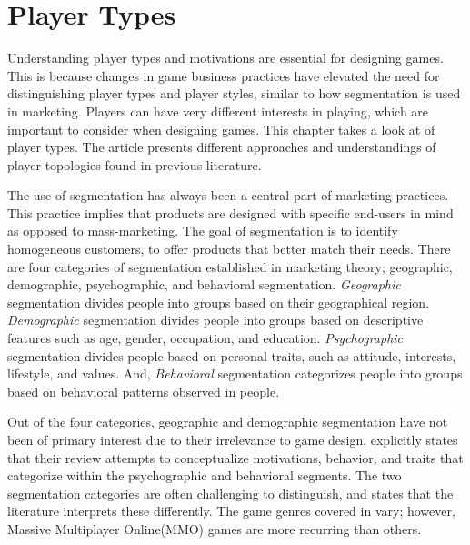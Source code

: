 \section{Player Types}
\label{chap:player_types}

Understanding player types and motivations are essential for designing games. This is because changes in game business practices have elevated the need for distinguishing player types and player styles, similar to how segmentation is used in marketing. Players can have very different interests in playing, which are important to consider when designing games. This chapter takes a look at \citet{hamari_player_2014} of player types. The article presents different approaches and understandings of player topologies found in previous literature. 

The use of segmentation has always been a central part of marketing practices. This practice implies that products are designed with specific end-users in mind as opposed to mass-marketing. The goal of segmentation is to identify homogeneous customers, to offer products that better match their needs. There are four categories of segmentation established in marketing theory; geographic, demographic, psychographic, and behavioral segmentation. \textit{Geographic} segmentation divides people into groups based on their geographical region. \textit{Demographic} segmentation divides people into groups based on descriptive features such as age, gender, occupation, and education. \textit{Psychographic} segmentation divides people based on personal traits, such as attitude, interests, lifestyle, and values. And, \textit{Behavioral} segmentation categorizes people into groups based on behavioral patterns observed in people.

Out of the four categories, geographic and demographic segmentation have not been of primary interest due to their irrelevance to game design. \citet{hamari_player_2014} explicitly states that their review attempts to conceptualize motivations, behavior, and traits that categorize within the psychographic and behavioral segments. The two segmentation categories are often challenging to distinguish, and \citet{hamari_player_2014} states that the literature interprets these differently. The game genres covered in \citet{hamari_player_2014} vary; however, Massive Multiplayer Online(MMO) games are more recurring than others.

